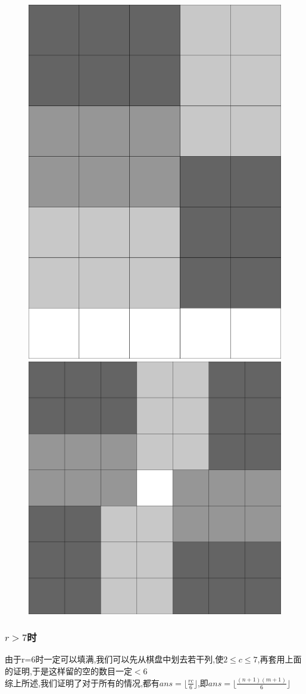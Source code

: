 \documentclass{beamer}
\begin{document}
\begin{frame}
\begin{figure}[htbp]
\begin{minipage}[t]{0.32\textwidth}
					\end{minipage}
				\end{figure}
				\begin{figure}[htbp]
					\centering
					\begin{minipage}[t]{0.48\textwidth}
						\centering
						\includegraphics[height=0.65\textwidth]{pictures/5-4.png}
					\end{minipage}
					\begin{minipage}[t]{0.48\textwidth}
						\centering
						\includegraphics[height=0.65\textwidth]{pictures/5-5.png}
					\end{minipage}
				\end{figure}

			\end{frame}
			\begin{frame}\frametitle{$r>7$时}
				由于r=6时一定可以填满,我们可以先从棋盘中划去若干列,使$2\le c\le7$,再套用上面的证明,于是这样留的空的数目一定$<6$\\
				综上所述,我们证明了对于所有的情况,都有$ans=\lfloor\frac{rc}{6}\rfloor$,即$ans=\lfloor\frac{(n+1)(m+1)}6\rfloor$
			\end{frame}
\end{document}

